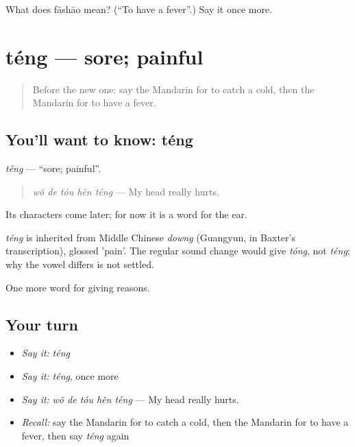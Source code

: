 \begin{tcolorbox}[breakable,colback=teal!4,colframe=teal!35!black,title={Before you move on}]
What does fāshāo mean? (\textquotedblleft{}To have a fever\textquotedblright{}.) Say it once more.
\end{tcolorbox}
\section[téng]{téng — sore; painful}

\label{lesson:ZH-C130-teng}



\begin{quote}
Before the new one: say the Mandarin for to catch a cold, then the Mandarin for to have a fever.
\end{quote}

\subsection*{You'll want to know: téng}
\emph{téng} — \textquotedblleft{}sore; painful\textquotedblright{}.

\begin{quote}
\emph{wǒ de tóu hěn téng} — My head really hurts.
\end{quote}

Its characters come later; for now it is a word for the ear.

\begin{cousinweb}
\emph{téng} is inherited from Middle Chinese \emph{downg} (Guangyun, in Baxter's transcription), glossed 'pain'. The regular sound change would give \emph{tóng}, not \emph{téng}; why the vowel differs is not settled.
\end{cousinweb}

\begin{grammarlens}[title={What you've built}]
One more word for giving reasons.
\end{grammarlens}

\subsection*{Your turn}
\begin{itemize}
\raggedright
  \item \emph{Say it:} \emph{téng}
  \item \emph{Say it:} \emph{téng}, once more
  \item \emph{Say it:} \emph{wǒ de tóu hěn téng} — My head really hurts.
  \item \emph{Recall:} say the Mandarin for to catch a cold, then the Mandarin for to have a fever, then say \emph{téng} again
\end{itemize}


